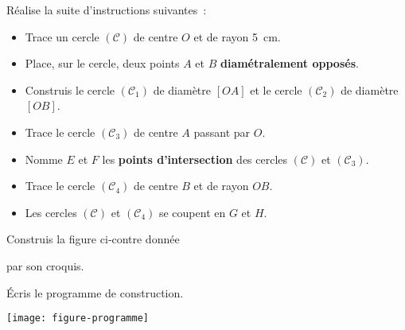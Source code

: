 \begin{activite}

 \begin{partie}
 Réalise la suite d'instructions suivantes :
 \begin{itemize}
  \item Trace un cercle $(\mathcal{C})$ de centre $O$ et de rayon 5 cm.
  \item Place, sur le cercle, deux points $A$ et $B$ \textbf{diamétralement opposés}.
  \item Construis le cercle $(\mathcal{C}_1)$ de diamètre $[OA]$ et le cercle $(\mathcal{C}_2)$ de diamètre $[OB]$.
  \item Trace le cercle $(\mathcal{C}_3)$ de centre $A$ passant par $O$.
  \item Nomme $E$ et $F$ les \textbf{points d'intersection} des cercles $(\mathcal{C})$ et $(\mathcal{C}_3)$.
  \item Trace le cercle $(\mathcal{C}_4)$ de centre $B$ et de rayon $OB$.
  \item Les cercles $(\mathcal{C})$ et $(\mathcal{C}_4)$ se coupent en $G$ et $H$.
  \end{itemize}
  
  \end{partie}
  
 \begin{partie}
 \begin{minipage}[c]{0.48\linewidth} 
Construis la figure ci‑contre donnée 

par son croquis.

Écris le programme de construction.
 \end{minipage} \hfill %
 \begin{minipage}[c]{0.46\linewidth}
 \texttt{[image: figure-programme]}
  \end{minipage} \\
  
  \end{partie}

\end{activite}


